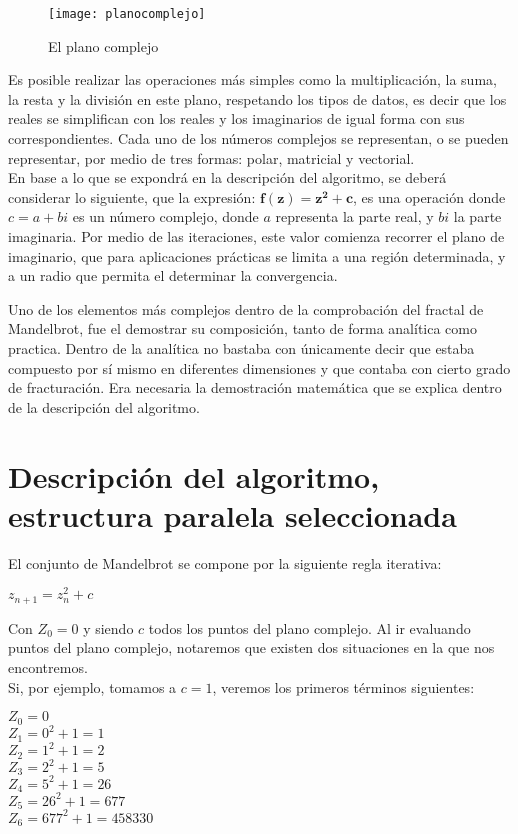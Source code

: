 \documentclass[12pt,a4paper]{article}
\begin{document}
		\begin{figure}[h]
			\centering
			\texttt{[image: planocomplejo]}
			\caption{El plano complejo}
		\end{figure}
		
		Es posible realizar las operaciones más simples como la multiplicación, la suma, la resta y la división en este plano, respetando los tipos de datos, es decir que los reales se simplifican con los reales y los imaginarios de igual forma con sus correspondientes. Cada uno de los números complejos se representan, o se pueden representar, por medio de tres formas: polar, matricial y vectorial.\\
		En base a lo que se expondrá en la descripción del algoritmo, se deberá considerar lo siguiente, que la expresión: $\mathbf{f(z) = z^2 + c}$, es una operación donde $c = a + bi$ es un número complejo, donde $a$ representa la parte real, y $bi$ la parte imaginaria. Por medio de las iteraciones, este valor comienza recorrer el plano de imaginario, que para aplicaciones prácticas se limita a una región determinada, y a un radio que permita el determinar la convergencia.
				
		Uno de los elementos más complejos dentro de la comprobación del fractal de Mandelbrot, fue el demostrar su composición, tanto de forma analítica como practica. Dentro de la analítica no bastaba con únicamente decir que estaba compuesto por sí mismo en diferentes dimensiones y que contaba con cierto grado de fracturación. Era necesaria la demostración matemática que se explica dentro de la descripción del algoritmo.  
		
	\section{Descripción del algoritmo, estructura paralela seleccionada}
		El conjunto de Mandelbrot se compone por la siguiente regla iterativa:
 		\begin{center}
			$z_{n+1} = z_{n}^2 + c$
		\end{center}
		
		Con  $Z_{0} = 0$ y siendo $c$ todos los puntos del plano complejo. Al ir evaluando puntos del plano complejo, notaremos que existen dos situaciones en la que nos encontremos.\\
		Si, por ejemplo, tomamos a $c = 1$, veremos los primeros términos siguientes:
		\begin{center}
			$Z_{0} = 0$\\
			$Z_{1} = 0^2 + 1 = 1$\\
			$Z_{2} = 1^2 + 1 = 2$\\
			$Z_{3} = 2^2 + 1 = 5$\\
			$Z_{4} = 5^2 + 1 = 26$\\
			$Z_{5} = 26^2 + 1 = 677$\\
			$Z_{6}= 677^2 + 1 = 458330$\\
		\end{center}
	
\end{document}
